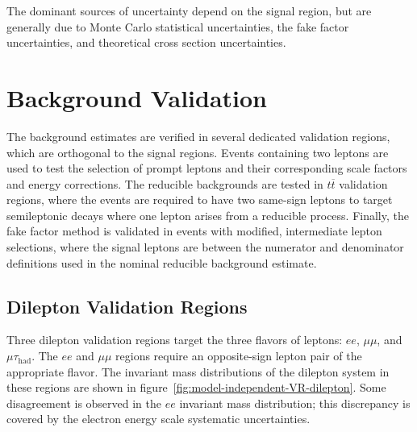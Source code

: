 The dominant sources of uncertainty depend on the signal region, but are generally due to Monte Carlo statistical uncertainties, the fake factor uncertainties, and theoretical cross section uncertainties. 

\section{Background Validation}\label{sec:model-independent-validation-regions}
The background estimates are verified in several dedicated validation regions, which are orthogonal to the signal regions. Events containing two leptons are used to test the selection of prompt leptons and their corresponding scale factors and energy corrections. The reducible backgrounds are tested in $t\overline{t}$ validation regions, where the events are required to have two same-sign leptons to target semileptonic decays where one lepton arises from a reducible process. Finally, the fake factor method is validated in events with modified, intermediate lepton selections, where the signal leptons are between the numerator and denominator definitions used in the nominal reducible background estimate.

\subsection{Dilepton Validation Regions}\label{sec:model-independent-validation-regions-dilepton}
Three dilepton validation regions target the three flavors of leptons: $ee$, $\mu\mu$, and $\mu\tau_{\mathrm{had}}$. The $ee$ and $\mu\mu$ regions require an opposite-sign lepton pair of the appropriate flavor. The invariant mass distributions of the dilepton system in these regions are shown in figure~\ref{fig:model-independent-VR-dilepton}. Some disagreement is observed in the $ee$ invariant mass distribution; this discrepancy is covered by the electron energy scale systematic uncertainties. 

